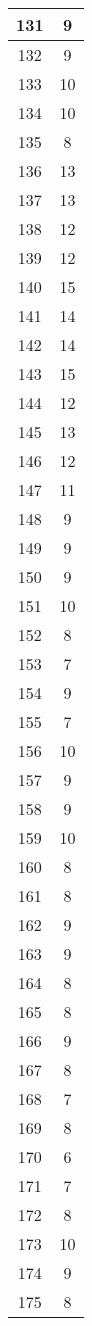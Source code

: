 \documentclass[letterpaper, 12pt]{article}
\begin{document}
\begin{longtable}{|c|c|}
\hline
131 & 9 \\
\hline
132 & 9 \\
\hline
133 & 10 \\
\hline
134 & 10 \\
\hline
135 & 8 \\
\hline
136 & 13 \\
\hline
137 & 13 \\
\hline
138 & 12 \\
\hline
139 & 12 \\
\hline
140 & 15 \\
\hline
141 & 14 \\
\hline
142 & 14 \\
\hline
143 & 15 \\
\hline
144 & 12 \\
\hline
145 & 13 \\
\hline
146 & 12 \\
\hline
147 & 11 \\
\hline
148 & 9 \\
\hline
149 & 9 \\
\hline
150 & 9 \\
\hline
151 & 10 \\
\hline
152 & 8 \\
\hline
153 & 7 \\
\hline
154 & 9 \\
\hline
155 & 7 \\
\hline
156 & 10 \\
\hline
157 & 9 \\
\hline
158 & 9 \\
\hline
159 & 10 \\
\hline
160 & 8 \\
\hline
161 & 8 \\
\hline
162 & 9 \\
\hline
163 & 9 \\
\hline
164 & 8 \\
\hline
165 & 8 \\
\hline
166 & 9 \\
\hline
167 & 8 \\
\hline
168 & 7 \\
\hline
169 & 8 \\
\hline
170 & 6 \\
\hline
171 & 7 \\
\hline
172 & 8 \\
\hline
173 & 10 \\
\hline
174 & 9 \\
\hline
175 & 8 \\

\end{longtable}
\end{document}
